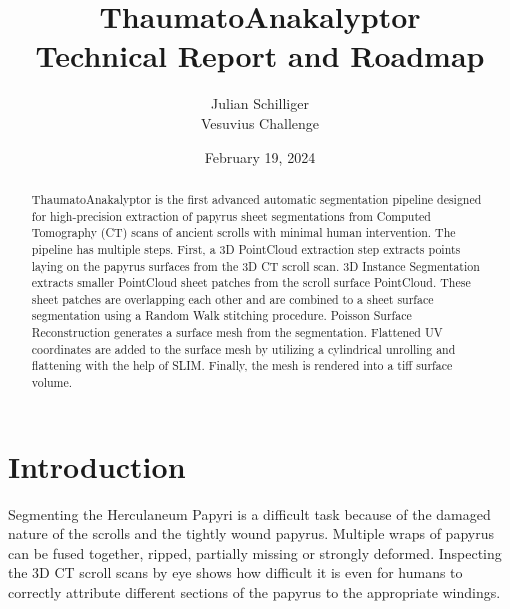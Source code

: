\documentclass[peerreview]{IEEEtran}
\begin{document}
\title{ThaumatoAnakalyptor \\ Technical Report and Roadmap}



\author{Julian Schilliger \\
Vesuvius Challenge\\
}
\date{February 19, 2024}

\maketitle
\tableofcontents
\listoffigures
\listoftables

\IEEEpeerreviewmaketitle
\begin{abstract}
ThaumatoAnakalyptor \cite{thaumato} is the first advanced automatic segmentation pipeline designed for high-precision extraction of papyrus sheet segmentations from Computed Tomography (CT) scans of ancient scrolls with minimal human intervention. The pipeline has multiple steps. First, a 3D PointCloud extraction step extracts points laying on the papyrus surfaces from the 3D CT scroll scan. 3D Instance Segmentation extracts smaller PointCloud sheet patches from the scroll surface PointCloud. These sheet patches are overlapping each other and are combined to a sheet surface segmentation using a Random Walk stitching procedure. Poisson Surface Reconstruction generates a surface mesh from the segmentation. Flattened UV coordinates are added to the surface mesh by utilizing a cylindrical unrolling and flattening with the help of SLIM. Finally, the mesh is rendered into a tiff surface volume.

\end{abstract}





\section{Introduction}
Segmenting the Herculaneum Papyri is a difficult task because of the damaged nature of the scrolls and the tightly wound papyrus. Multiple wraps of papyrus can be fused together, ripped, partially missing or strongly deformed. Inspecting the 3D CT scroll scans by eye shows how difficult it is even for humans to correctly attribute different sections of the papyrus to the appropriate windings.
\end{document}
